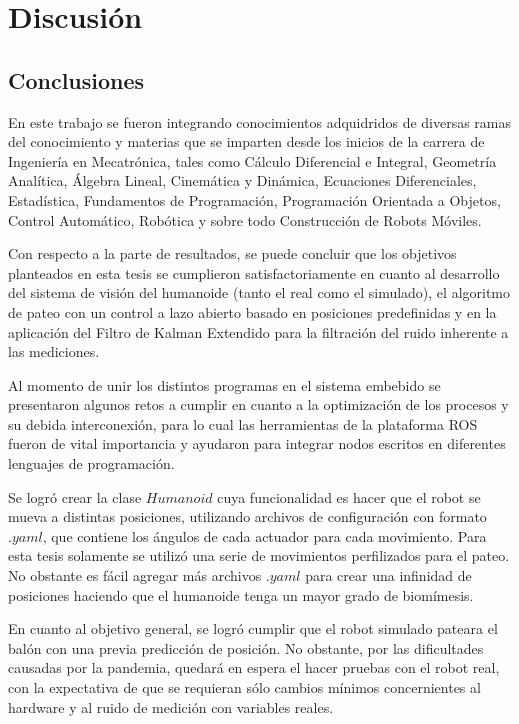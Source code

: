 \chapter{Discusión}
\section{Conclusiones}
	En este trabajo se fueron integrando conocimientos adquidridos de diversas ramas del conocimiento y materias que se imparten desde los inicios de la carrera de Ingeniería en Mecatrónica, tales como Cálculo Diferencial e Integral, Geometría Analítica, Álgebra Lineal, Cinemática y Dinámica, Ecuaciones Diferenciales, Estadística, Fundamentos de Programación, Programación Orientada a Objetos, Control Automático, Robótica y sobre todo Construcción de Robots Móviles.	
	
	Con respecto a la parte de resultados, se puede concluir que los objetivos planteados en esta tesis se cumplieron satisfactoriamente en cuanto al desarrollo del sistema de visión del humanoide (tanto el real como el simulado), el algoritmo de pateo con un control a lazo abierto basado en posiciones predefinidas y en la aplicación del Filtro de Kalman Extendido para la filtración del ruido inherente a las mediciones.

	Al momento de unir los distintos programas en el sistema embebido se presentaron algunos retos a cumplir en cuanto a la optimización de los procesos y su debida interconexión, para lo cual las herramientas de la plataforma ROS fueron de vital importancia y ayudaron para integrar nodos escritos en diferentes lenguajes de programación.

	Se logró crear la clase $Humanoid$ cuya funcionalidad es hacer que el robot se mueva a distintas posiciones, utilizando archivos de configuración con formato $.yaml$, que contiene los ángulos de cada actuador para cada movimiento. Para esta tesis solamente se utilizó una serie de movimientos perfilizados para el pateo. No obstante es fácil agregar más archivos $.yaml$ para crear una infinidad de posiciones haciendo que el humanoide tenga un mayor grado de biomímesis.

	En cuanto al objetivo general, se logró cumplir que el robot simulado pateara el balón con una previa predicción de posición. No obstante, por las dificultades causadas por la pandemia, quedará en espera el hacer pruebas con el robot real, con la expectativa de que se requieran sólo cambios mínimos concernientes al hardware y al ruido de medición con variables reales.
	
